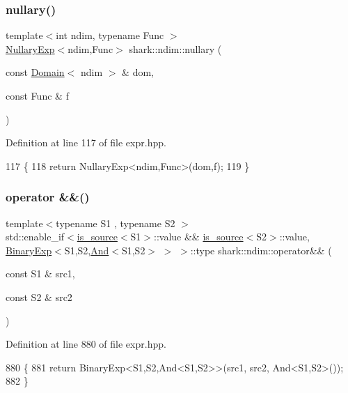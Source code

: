 \subsubsection{\texorpdfstring{nullary()}{nullary()}}
{\footnotesize\ttfamily template$<$int ndim, typename Func $>$ \\
\hyperlink{classshark_1_1ndim_1_1_nullary_exp}{Nullary\+Exp}$<$ndim,Func$>$ shark\+::ndim\+::nullary (\begin{DoxyParamCaption}\item[{const \hyperlink{classshark_1_1ndim_1_1_domain}{Domain}$<$ ndim $>$ \&}]{dom,  }\item[{const Func \&}]{f }\end{DoxyParamCaption})}



Definition at line 117 of file expr.\+hpp.


\begin{DoxyCode}
117                                                                               \{
118             \textcolor{keywordflow}{return} NullaryExp<ndim,Func>(dom,f);
119         \}
\end{DoxyCode}
\hypertarget{namespaceshark_1_1ndim_a78f5768d2fcffe7803b9422aa1333670}{}\label{namespaceshark_1_1ndim_a78f5768d2fcffe7803b9422aa1333670} 
\subsubsection{\texorpdfstring{operator \&\&()}{operator \&\&()}}
{\footnotesize\ttfamily template$<$typename S1 , typename S2 $>$ \\
std\+::enable\+\_\+if$<$\hyperlink{classshark_1_1ndim_1_1is__source}{is\+\_\+source}$<$S1$>$\+::value \&\& \hyperlink{classshark_1_1ndim_1_1is__source}{is\+\_\+source}$<$S2$>$\+::value, \hyperlink{classshark_1_1ndim_1_1_binary_exp}{Binary\+Exp}$<$S1,S2,\hyperlink{classshark_1_1ndim_1_1_and}{And}$<$S1,S2$>$ $>$ $>$\+::type shark\+::ndim\+::operator\&\& (\begin{DoxyParamCaption}\item[{const S1 \&}]{src1,  }\item[{const S2 \&}]{src2 }\end{DoxyParamCaption})}



Definition at line 880 of file expr.\+hpp.


\begin{DoxyCode}
880                                                                                                            
                                               \{
881             \textcolor{keywordflow}{return} BinaryExp<S1,S2,And<S1,S2>>(src1, src2, And<S1,S2>());
882         \}
\end{DoxyCode}
\hypertarget{namespaceshark_1_1ndim_a22d58cb2f1b5492ff59617c74585903e}{}\label{namespaceshark_1_1ndim_a22d58cb2f1b5492ff59617c74585903e} 
